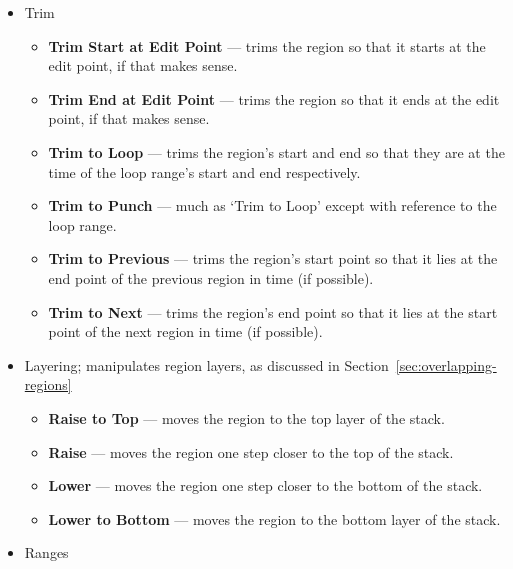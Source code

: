 \documentclass[10pt,a4paper]{book}
\begin{document}
{\begin{itemize}
\begin{itemize}
\item Glue to Bars and Beats
\item Snap Position To Grid
\item Set Sync Position
\item Remove Sync
\item Nudge Forward
\item Nudge Backward
\item Nudge Forward by Capture Offset
\item Nudge Backward by Capture Offset
\end{itemize}
\item Trim
\begin{itemize}
\item \textbf{Trim Start at Edit Point} --- trims the region so that
  it starts at the edit point, if that makes sense.
\item \textbf{Trim End at Edit Point} --- trims the region so that
  it ends at the edit point, if that makes sense.
\item \textbf{Trim to Loop} --- trims the region's start and end so
  that they are at the time of the loop range's start and end
  respectively.
\item \textbf{Trim to Punch} --- much as `Trim to Loop' except with
  reference to the loop range.
\item \textbf{Trim to Previous} --- trims the region's start point so
  that it lies at the end point of the previous region in time (if
  possible).
\item \textbf{Trim to Next} --- trims the region's end point so
  that it lies at the start point of the next region in time (if
  possible).
\end{itemize}
\item Layering; manipulates region layers, as discussed in
  Section~\ref{sec:overlapping-regions}
\begin{itemize}
\item \textbf{Raise to Top} --- moves the region to the top layer of
  the stack.
\item \textbf{Raise} --- moves the region one step closer to the top
  of the stack.
\item \textbf{Lower} --- moves the region one step closer to the
  bottom of the stack.
\item \textbf{Lower to Bottom} --- moves the region to the bottom
  layer of the stack.
\end{itemize}
\item Ranges
\begin{itemize}

\end{itemize}
\end{itemize}}
\end{document}
